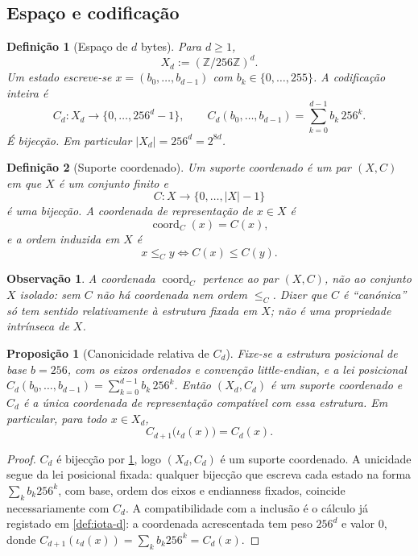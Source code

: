 \documentclass[11pt,a4paper]{article}
\newtheorem{definicao}{Definição}
\newtheorem{proposicao}{Proposição}
\newtheorem{observacao}{Observação}
\begin{document}
\subsection{Espaço e codificação}

\begin{definicao}[Espaço de \(d\) bytes]
\label{def:Xd}
Para \(d\ge 1\),
\[
X_d:=(\mathbb Z/256\mathbb Z)^d.
\]
Um estado escreve-se \(x=(b_0,\dots,b_{d-1})\) com \(b_k\in\{0,\dots,255\}\). A codificação inteira é
\[
C_d:X_d\to\{0,\dots,256^d-1\},
\qquad
C_d(b_0,\dots,b_{d-1})=\sum_{k=0}^{d-1}b_k\,256^k.
\]
É bijecção. Em particular \(\lvert X_d\rvert=256^d=2^{8d}\).
\end{definicao}

\begin{definicao}[Suporte coordenado]
\label{def:suporte-coordenado}
Um \emph{suporte coordenado} é um par \((X,C)\) em que \(X\) é um conjunto finito e
\[
C\colon X\to\{0,\dots,\lvert X\rvert-1\}
\]
é uma bijecção. A \emph{coordenada de representação} de \(x\in X\) é
\[
\operatorname{coord}_C(x)=C(x),
\]
e a \emph{ordem induzida} em \(X\) é
\[
x\le_C y\iff C(x)\le C(y).
\]
\end{definicao}

\begin{observacao}
\label{obs:coord-nao-intrinseca}
A coordenada \(\operatorname{coord}_C\) pertence ao par \((X,C)\), não ao conjunto \(X\) isolado: sem \(C\) não há coordenada nem ordem \(\le_C\). Dizer que \(C\) é ``canónica'' só tem sentido relativamente à estrutura fixada em \(X\); não é uma propriedade intrínseca de \(X\).
\end{observacao}

\begin{proposicao}[Canonicidade relativa de \(C_d\)]
\label{prop:Cd-relativa}
Fixe-se a estrutura posicional de base \(b=256\), com os eixos ordenados e convenção little-endian, e a lei posicional \(C_d(b_0,\dots,b_{d-1})=\sum_{k=0}^{d-1}b_k\,256^k\). Então \((X_d,C_d)\) é um suporte coordenado e \(C_d\) é a única coordenada de representação compatível com essa estrutura. Em particular, para todo \(x\in X_d\),
\[
C_{d+1}\bigl(\iota_d(x)\bigr)=C_d(x).
\]
\end{proposicao}

\begin{proof}
\(C_d\) é bijecção por \ref{def:Xd}, logo \((X_d,C_d)\) é um suporte coordenado. A unicidade segue da lei posicional fixada: qualquer bijecção que escreva cada estado na forma \(\sum_k b_k256^k\), com base, ordem dos eixos e endianness fixados, coincide necessariamente com \(C_d\). A compatibilidade com a inclusão é o cálculo já registado em \ref{def:iota-d}: a coordenada acrescentada tem peso \(256^d\) e valor \(0\), donde \(C_{d+1}(\iota_d(x))=\sum_k b_k256^k=C_d(x)\).
\end{proof}
\end{document}
